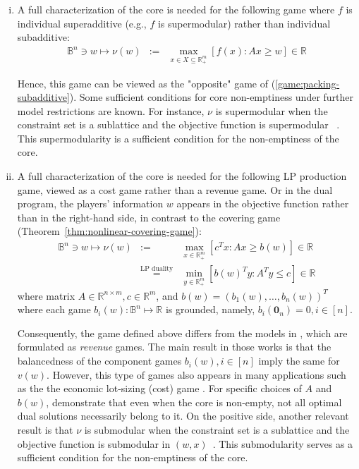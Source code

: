 \documentclass[11pt]{article}\usepackage[]{graphicx}\usepackage[]{xcolor}
\begin{document}
\begin{enumerate}[(i)]
\item A full characterization of the core is needed for the following game where $f$ is individual superadditive (e.g., $f$ is supermodular) rather than individual subadditive:
\begin{eqnarray*}
\mathbb{B}^n\ni w\mapsto \nu(w)&:=&\max_{x\in X\subseteq \mathbb{R}^m_{+}} \left[f(x): Ax\ge w\right]\in  \mathbb{R}
\end{eqnarray*}

Hence, this game can be viewed as the "opposite" game of (\ref{game:packing-subadditive}). Some sufficient conditions for core non-emptiness under further model restrictions are known. For instance, $\nu$ is supermodular when the constraint set is a sublattice and the objective function is supermodular ~\citep[Theorem 2.7.6]{Topkis1998}. This supermodularity is a sufficient condition for the non-emptiness of the core.




\item A full characterization of the core is needed for the following LP production game, viewed as a cost game rather than a revenue game. Or in the dual program, the players' information $w$ appears in the objective function rather than in the right-hand side, in contrast to the covering game (Theorem~\ref{thm:nonlinear-covering-game}):
\begin{eqnarray*}
\mathbb{B}^n\ni w\mapsto \nu(w)&:=&\max_{x\in \mathbb{R}^m_{+}} \left[c^Tx: Ax\ge b(w)\right]\in  \mathbb{R}\\
&\overset{\text{LP duality}}{=}&\min_{y\in \mathbb{R}^m_{+}} \left[b(w)^Ty: A^Ty\le c\right]\in  \mathbb{R}
\end{eqnarray*}
where matrix $A\in \mathbb{R}^{n\times m}, c\in \mathbb{R}^{m}$, and $b(w)=(b_1(w), \dots, b_n(w))^T$ where each game $b_i(w): \mathbb{B}^{n}\mapsto \mathbb{R}$ is grounded, namely, $b_i\left(\mathbf{0}_n\right)=0, i\in [n]$.


Consequently, the game defined above differs from the models in \citep{owen1975core,granot1986generalized}, which are formulated as \emph{revenue} games. The main result in those works is that the balancedness of the component games $b_i(w), i\in [n]$ imply the same for $v(w)$. However, this type of games also appears in many applications such as the the economic lot-sizing  (cost) game \citep{chen2016duality}. For specific choices of $A$ and $b(w)$, \citep{chen2016duality} demonstrate that even when the core is non-empty, not all optimal dual solutions necessarily belong to it. On the positive side, another relevant result is that $\nu$ is submodular when the constraint set is a sublattice and the objective function is submodular in $(w, x)$~\citep[Theorem 2.7.6]{Topkis1998}. This submodularity serves as a sufficient condition for the non-emptiness of the core.





\end{enumerate}
\end{document}
